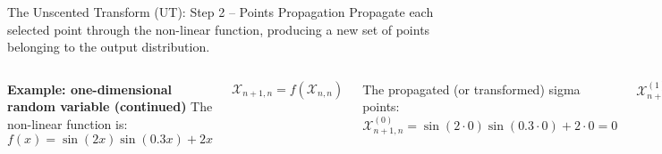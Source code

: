 \begin{frame}{The Unscented Transform (UT): Step 2 – Points Propagation}
Propagate each selected point through the non-linear function, producing a new set of points belonging to the output distribution.
\begin{columns}
\textbf{Example: one-dimensional random variable (continued)}
The non-linear function is:
\[
f(x) = \sin(2x)\sin(0.3x) + 2x
\]

\[
\mathcal{X}_{n+1,n} = f(\mathcal{X}_{n,n})
\]

The propagated (or transformed) sigma points:
\[
\mathcal{X}^{(0)}_{n+1,n} = \sin(2 \cdot 0)\sin(0.3 \cdot 0) + 2 \cdot 0 = 0
\]

\[
\mathcal{X}^{(1)}_{n+1,n} = \sin(2 \cdot 3.46)\sin(0.3 \cdot 3.46) + 2 \cdot 3.46 = 7.45
\]

\begin{align*}
  \mathcal{X}^{(2)}_{n+1,n} & = \sin(2 \cdot (-3.46))\sin(0.3 \cdot (-3.46)) \\ & + 2 \cdot (-3.46) = -6.41  
\end{align*}

\begin{figure}
    \centering
    \includegraphics[width=0.95\linewidth]{Figures//Part3/1DSigmaPointPropagation.png}
    \caption{1D RV Sigma Points propagation.}
\end{figure}
\begin{itemize}
    \item The green line on the left plot is the PDF of the input random variable. The red
circles on the left plot are the sigma points ($\mathcal{X}_{n,n}$) of the input random variable.
\item The green line on the right plot is the PDF of the input random variable after the
non-linear transformation. The red circles on the right plot are the sigma points
after the non-linear transformation ($\mathcal{X}_{n+1,n}$).
\end{itemize}
\end{columns}
\end{frame}


